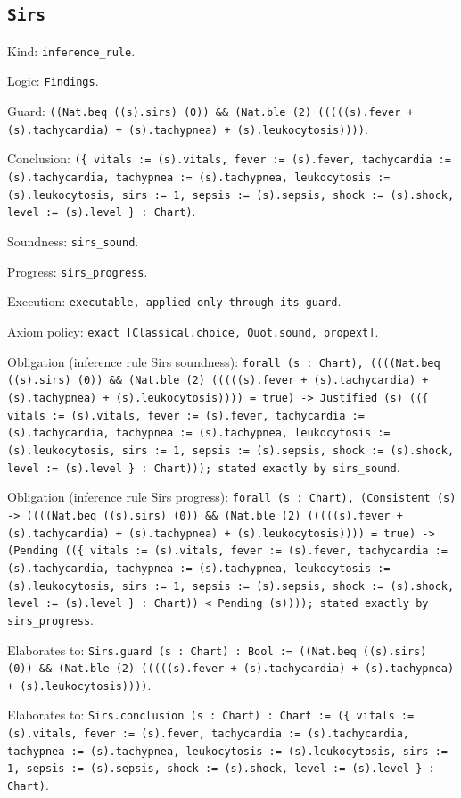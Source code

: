 \documentclass[11pt]{article}
\begin{document}
\subsection*{\texttt{Sirs}}
\noindent Kind: \texttt{inference_rule}.\par
\noindent Logic: \texttt{Findings}.\par
\noindent Guard: \texttt{((Nat.beq ((s).sirs) (0)) \&\& (Nat.ble (2) (((((s).fever + (s).tachycardia) + (s).tachypnea) + (s).leukocytosis))))}.\par
\noindent Conclusion: \texttt{(\{ vitals := (s).vitals, fever := (s).fever, tachycardia := (s).tachycardia, tachypnea := (s).tachypnea, leukocytosis := (s).leukocytosis, sirs := 1, sepsis := (s).sepsis, shock := (s).shock, level := (s).level \} : Chart)}.\par
\noindent Soundness: \texttt{sirs\_sound}.\par
\noindent Progress: \texttt{sirs\_progress}.\par
\noindent Execution: \texttt{executable, applied only through its guard}.\par
\noindent Axiom policy: \texttt{exact [Classical.choice, Quot.sound, propext]}.\par
\noindent Obligation (inference rule Sirs soundness): \texttt{forall (s : Chart), ((((Nat.beq ((s).sirs) (0)) \&\& (Nat.ble (2) (((((s).fever + (s).tachycardia) + (s).tachypnea) + (s).leukocytosis)))) = true) -> Justified (s) ((\{ vitals := (s).vitals, fever := (s).fever, tachycardia := (s).tachycardia, tachypnea := (s).tachypnea, leukocytosis := (s).leukocytosis, sirs := 1, sepsis := (s).sepsis, shock := (s).shock, level := (s).level \} : Chart))); stated exactly by sirs\_sound}.\par
\noindent Obligation (inference rule Sirs progress): \texttt{forall (s : Chart), (Consistent (s) -> ((((Nat.beq ((s).sirs) (0)) \&\& (Nat.ble (2) (((((s).fever + (s).tachycardia) + (s).tachypnea) + (s).leukocytosis)))) = true) -> (Pending ((\{ vitals := (s).vitals, fever := (s).fever, tachycardia := (s).tachycardia, tachypnea := (s).tachypnea, leukocytosis := (s).leukocytosis, sirs := 1, sepsis := (s).sepsis, shock := (s).shock, level := (s).level \} : Chart)) < Pending (s)))); stated exactly by sirs\_progress}.\par
\noindent Elaborates to: \texttt{Sirs.guard (s : Chart) : Bool := ((Nat.beq ((s).sirs) (0)) \&\& (Nat.ble (2) (((((s).fever + (s).tachycardia) + (s).tachypnea) + (s).leukocytosis))))}.\par
\noindent Elaborates to: \texttt{Sirs.conclusion (s : Chart) : Chart := (\{ vitals := (s).vitals, fever := (s).fever, tachycardia := (s).tachycardia, tachypnea := (s).tachypnea, leukocytosis := (s).leukocytosis, sirs := 1, sepsis := (s).sepsis, shock := (s).shock, level := (s).level \} : Chart)}.\par
\end{document}
